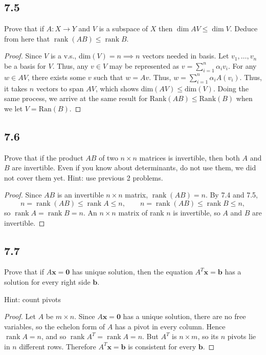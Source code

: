 \documentclass{amsart}
\begin{document}
\subsection*{7.5}
Prove that if $A : X \to Y$ and $V$ is a subspace of $X$ then $\dim AV \le \dim V$. Deduce from here that $\operatorname{rank}(AB) \le \operatorname{rank} B$.
\begin{proof}
  Since $V$ is a v.s., dim$(V)=n \implies n$ vectors needed in basis. Let $v_1,\ldots,v_n$ be a basis for $V$. Thus, any $v \in V$ may be represented as $v = \sum_{i=1}^{n}\alpha_i v_i$. For any $w \in AV$, there exists some $v$ such that $w = Av$. Thus, $w = \sum_{i=1}^{n}\alpha_i A(v_i)$. Thus, it takes $n$ vectors to span $AV$, which shows dim$(AV) \le \text{dim}(V)$. Doing the same process, we arrive at the same result for $\text{Rank}(AB) \le \text{Rank}(B)$ when we let $V = \text{Ran}(B)$.  
\end{proof}

\subsection*{7.6}
Prove that if the product $AB$ of two $n \times n$ matrices is invertible, then both $A$ and $B$ are invertible. Even if you know about determinants, do not use them, we did not cover them yet. Hint: use previous 2 problems.
\begin{proof}
Since $AB$ is an invertible $n\times n$ matrix, $\operatorname{rank}(AB) = n$. By 7.4 and 7.5,
\[
n = \operatorname{rank}(AB) \le \operatorname{rank}A \le n, \qquad n = \operatorname{rank}(AB) \le \operatorname{rank}B \le n,
\]
so $\operatorname{rank}A = \operatorname{rank}B = n$. An $n\times n$ matrix of rank $n$ is invertible, so $A$ and $B$ are invertible.
\end{proof}

\subsection*{7.7}
Prove that if $A\mathbf{x} = \mathbf{0}$ has unique solution, then the equation $A^T\mathbf{x} = \mathbf{b}$ has a solution for every right side $\mathbf{b}$.

Hint: count pivots

\begin{proof}
Let $A$ be $m\times n$. Since $A\mathbf{x}=\mathbf{0}$ has a unique solution, there are no free variables, so the echelon form of $A$ has a pivot in every column. Hence $\operatorname{rank}A = n$, and so $\operatorname{rank}A^T = \operatorname{rank}A = n$. But $A^T$ is $n\times m$, so its $n$ pivots lie in $n$ different rows. Therefore $A^T\mathbf{x}=\mathbf{b}$ is consistent for every $\mathbf{b}$.
\end{proof}
\end{document}
